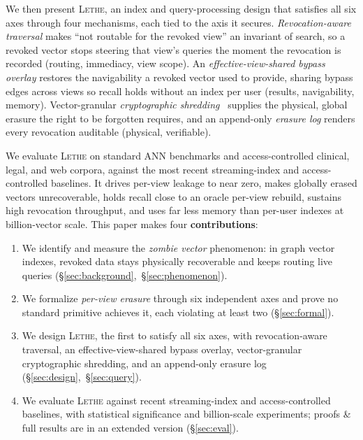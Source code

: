 \documentclass[sigconf, nonacm, review]{acmart}
\newcommand\vldbavailabilityurl{https://anonymous.4open.science/r/lethe/}
\newif\ifextended\extendedtrue %
\begin{document}
We then present \textsc{Lethe}, an index and query-processing design that
satisfies all six axes through four mechanisms, each tied to the axis it
secures. \emph{Revocation-aware traversal} makes ``not routable for the
revoked view'' an invariant of search, so a revoked vector stops steering
that view's queries the moment the revocation is recorded (routing,
immediacy, view scope). An \emph{effective-view-shared bypass overlay}
restores the navigability a revoked vector used to provide, sharing bypass
edges across views so recall holds without an index per user (results,
navigability, memory). Vector-granular \emph{cryptographic
shredding}~\cite{DBLP:journals/corr/abs-2601-07004} supplies the physical,
global erasure the right to be forgotten requires, and an append-only
\emph{erasure log} renders every revocation auditable (physical, verifiable).

We evaluate \textsc{Lethe} on standard ANN benchmarks and access-controlled
clinical, legal, and web corpora, against the most recent streaming-index
and access-controlled baselines. It drives per-view leakage to near zero,
makes globally erased vectors unrecoverable, holds recall close to an oracle
per-view rebuild, sustains high revocation throughput, and uses far less
memory than per-user indexes at billion-vector scale. This paper makes four \textbf{contributions}:
\begin{enumerate}
\item We identify and measure the \emph{zombie vector} phenomenon: in
graph vector indexes, revoked data stays physically recoverable and keeps
routing live queries
(\S\ref{sec:background},~\S\ref{sec:phenomenon}).
\item We formalize \emph{per-view erasure} through six independent axes and
prove no standard primitive achieves it, each violating at least two
(\S\ref{sec:formal}).
\item We design \textsc{Lethe}, the first to satisfy all six axes, with
revocation-aware traversal, an effective-view-shared bypass overlay,
vector-granular cryptographic shredding, and an append-only erasure log
(\S\ref{sec:design},~\S\ref{sec:query}).
\item We evaluate \textsc{Lethe} against recent
streaming-index and access-controlled baselines, with statistical
significance and billion-scale experiments\ifextended; proofs \& full results
are in an extended version (\S\ref{sec:eval}).\else\ (\S\ref{sec:eval}). An extended version, available at \textcolor{blue}{\url{\vldbavailabilityurl}}, provides the full proofs and formal model, the complete baseline comparison and generality study, additional ablations and sensitivity analyses, the security evaluation, and full reproducibility details and statistics.\fi
\end{enumerate}
\end{document}
